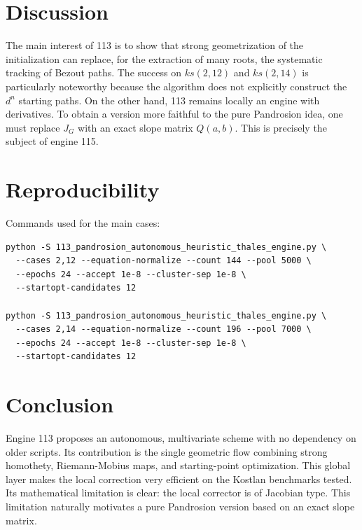 \documentclass[11pt,a4paper]{article}
\begin{document}
\section{Discussion}
The main interest of 113 is to show that strong geometrization of the initialization can replace, for the extraction of many roots, the systematic tracking of Bezout paths. The success on \(ks(2,12)\) and \(ks(2,14)\) is particularly noteworthy because the algorithm does not explicitly construct the \(d^n\) starting paths. On the other hand, 113 remains locally an engine with derivatives. To obtain a version more faithful to the pure Pandrosion idea, one must replace \(J_G\) with an exact slope matrix \(Q(a,b)\). This is precisely the subject of engine 115.

\section{Reproducibility}
Commands used for the main cases:
\begin{verbatim}
python -S 113_pandrosion_autonomous_heuristic_thales_engine.py \
  --cases 2,12 --equation-normalize --count 144 --pool 5000 \
  --epochs 24 --accept 1e-8 --cluster-sep 1e-8 \
  --startopt-candidates 12

python -S 113_pandrosion_autonomous_heuristic_thales_engine.py \
  --cases 2,14 --equation-normalize --count 196 --pool 7000 \
  --epochs 24 --accept 1e-8 --cluster-sep 1e-8 \
  --startopt-candidates 12
\end{verbatim}

\section{Conclusion}
Engine 113 proposes an autonomous, multivariate scheme with no dependency on older scripts. Its contribution is the single geometric flow combining strong homothety, Riemann-Mobius maps, and starting-point optimization. This global layer makes the local correction very efficient on the Kostlan benchmarks tested. Its mathematical limitation is clear: the local corrector is of Jacobian type. This limitation naturally motivates a pure Pandrosion version based on an exact slope matrix.
\end{document}
